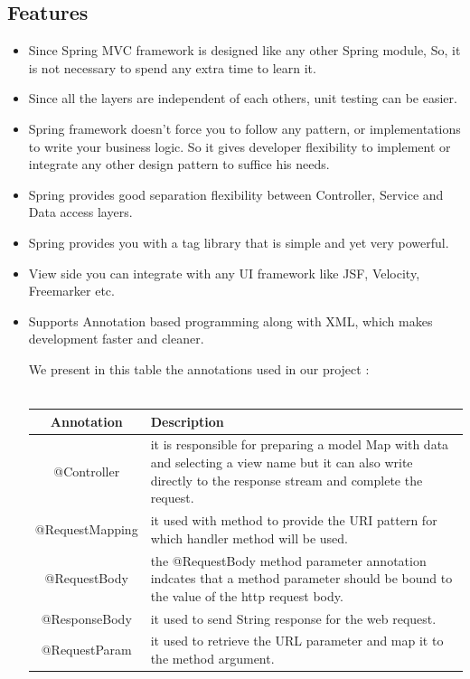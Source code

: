 \subsection{Features}
\begin{itemize}
	\item Since Spring MVC framework is designed like any other Spring module, So, it is not necessary to spend any extra time to learn it.
	\item Since all the layers are independent of each others, unit testing can be easier.
	\item Spring framework doesn’t force you to follow any pattern, or implementations to write your business logic. So it gives developer flexibility to implement or integrate any other design pattern to suffice his needs.
	\item Spring provides good separation flexibility between Controller, Service and Data access layers.
	\item Spring provides you with a tag library that is simple and yet very powerful.
	\item View side you can integrate with any UI framework like JSF, Velocity, Freemarker etc.
	\item Supports Annotation based programming along with XML, which makes development faster and cleaner.
	
	We present in this table the annotations used in our project :
	\\
	\\
		\begin{table}
		\centering
		\begin{tabular}{|c|p{10cm}|}
		\hline
		\textbf{Annotation} & \textbf{Description }\\
		\hline
		@Controller & it is responsible for preparing a model Map with data and selecting a view name but it can also write directly to the response stream and complete the request.  \\
		@RequestMapping & it used with method to provide the URI pattern for which handler method will be used.\\
		@RequestBody & the @RequestBody method parameter annotation indcates that a method parameter should be bound to the value of the http request body.  \\
		@ResponseBody & it used to send String response for the web request.  \\	
	    @RequestParam & it used to retrieve the URL parameter and map it to the method argument. \\
		\hline
	\end{tabular}
	\end{table}

\end{itemize}
\newpage
